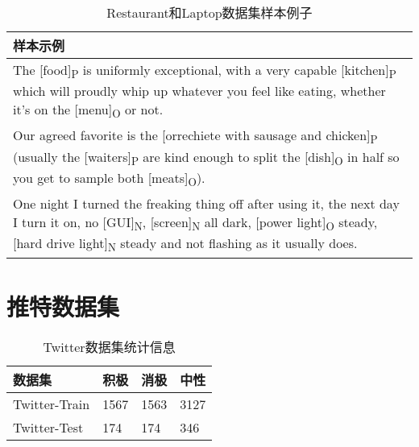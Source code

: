 \begin{table}[H]
	\centering
	\begin{minipage}[t]{0.8\linewidth} %
		\caption[Restaurant和Laptop数据集样本例子]{Restaurant和Laptop数据集样本例子}
		\label{tab:res-lap-case}
		\begin{tabularx}{\linewidth}{X}
			\toprule[1.5pt]
			{\heiti 样本示例} \\\midrule[1pt]
			The [food]\textsubscript{P} is uniformly exceptional, with a very capable [kitchen]\textsubscript{P} which will proudly whip up whatever you feel like eating, whether it's on the [menu]\textsubscript{O} or not. \\  \midrule[1pt]
			Our agreed favorite is the [orrechiete with sausage and chicken]\textsubscript{P} (usually the [waiters]\textsubscript{P} are kind enough to split the [dish]\textsubscript{O} in half so you get to sample both [meats]\textsubscript{O}).  \\ \midrule[1pt]
			One night I turned the freaking thing off after using it, the next day I turn it on, no [GUI]\textsubscript{N}, [screen]\textsubscript{N} all dark, [power light]\textsubscript{O} steady, [hard drive light]\textsubscript{N} steady and not flashing as it usually does. \\ 
			\bottomrule[1.5pt]
		\end{tabularx}
	\end{minipage}
\end{table}

\section{推特数据集}

\begin{table}[htb]
	\centering
	\begin{minipage}[t]{0.5\linewidth} %
		\caption[Twitter数据集统计信息]{Twitter数据集统计信息}
		\label{tab:twitterdataset}
		\begin{tabularx}{\linewidth}{Xlll}
			\toprule[1.5pt]
			{\heiti 数据集} & {\heiti 积极} & {\heiti 消极} & {\heiti 中性} \\\midrule[1pt]
			Twitter-Train & 1567 & 1563 & 3127 \\
			Twitter-Test & 174 & 174 & 346 \\
			\bottomrule[1.5pt]
		\end{tabularx}
	\end{minipage}
\end{table}

